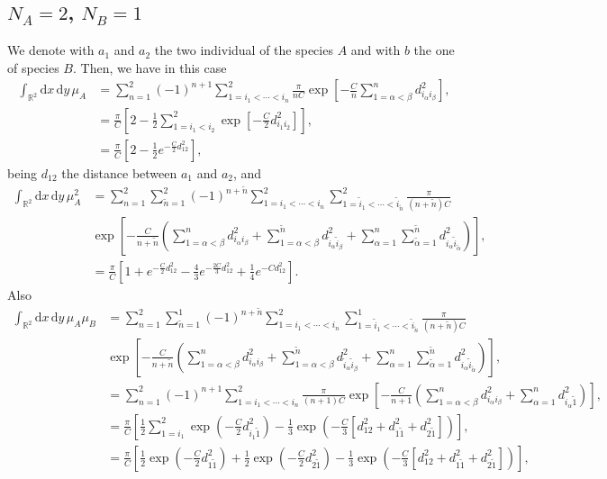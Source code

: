 \documentclass[12pt]{article}
\newcommand{\xd}{\mathrm{d}}
\numberwithin{equation}{section} %
\numberwithin{figure}{section} %
\theoremstyle{definition}
\begin{document}
\subsection{$N_A=2$, $N_B=1$}
We denote with $a_1$ and $a_2$ the two individual of the species $A$ and with $b$ the one of species $B$.  Then, we have in this case
\begin{align}
\int_{{\mathbb R}^2} \xd x \, \xd y \, \mu_A&= \sum_{n=1}^{2} (-1)^{n+1} \sum_{ 1=i_1< \cdots <i_n }^{2} \frac{\pi}{nC} \exp \left[ - \frac{C}{n} \sum_{1=\alpha < \beta}^n d_{i_{\alpha} i_{\beta}}^2 \right], \\
&= \frac{\pi}{C} \left[ 2 - \frac12  \sum_{ 1=i_1< i_2}^{2} \exp \left[- \frac{C}{2}  d_{i_{1} i_{2}}^2 \right]  \right], \\
&= \frac{\pi}{C} \left[ 2 - \frac12  e^{- \frac{C}{2}  d_{{1} {2}}^2 } \right],
\end{align}
being $d_{12}$ the distance between $a_1$ and $a_2$, and
\begin{align}
\int_{{\mathbb R}^2} \xd x \, \xd y \, \mu_A^2 &=  \sum_{n=1}^{2} \sum_{\tilde{n}=1}^{2} (-1)^{n+\tilde{n}} \sum_{ 1=i_1< \cdots <i_n }^{2} \sum_{ 1=\tilde{i}_1< \cdots <\tilde{i}_{\tilde{n}} }^{2} \frac{\pi}{(n+\tilde{n})C}
 \nonumber\\
& \exp \left[ - \frac{C}{n+\tilde{n}} \left( \sum_{1=\alpha < \beta}^n d_{i_{\alpha} i_{\beta}}^2 + \sum_{1=\alpha < \beta}^{\tilde{n}} d_{\tilde{i}_{\alpha} \tilde{i}_{\beta}}^2 +
\sum_{\alpha=1}^n \sum_{\tilde{\alpha}=1}^{\tilde{n}}  d_{i_{\alpha} \tilde{i}_{\tilde{\alpha}}}^2 \right) \right], \\
&= \frac{\pi}{C} \left[ 1+e^{- \frac{C}{2}d^2_{12}} - \frac{4}{3} e^{- \frac{2C}{3} d^2_{1 2} } + \frac{1}{4} e^{- C d_{12}^2 }  \right].
\end{align}
Also
\begin{align}
\int_{{\mathbb R}^2} \xd x \, \xd y \, \mu_A \mu_B &=  \sum_{n=1}^{2} \sum_{\tilde{n}=1}^{1} (-1)^{n+\tilde{n}} \sum_{ 1=i_1< \cdots <i_n }^{2} \sum_{ 1=\tilde{i}_1< \cdots <\tilde{i}_{\tilde{n}} }^{1} \frac{\pi}{(n+\tilde{n})C}
 \nonumber\\
& \exp \left[ - \frac{C}{n+\tilde{n}} \left( \sum_{1=\alpha < \beta}^n d_{i_{\alpha} i_{\beta}}^2 + \sum_{1=\alpha < \beta}^{\tilde{n}} d_{\tilde{i}_{\alpha} \tilde{i}_{\beta}}^2 +
\sum_{\alpha=1}^n \sum_{\tilde{\alpha}=1}^{\tilde{n}}  d_{i_{\alpha} \tilde{i}_{\tilde{\alpha}}}^2 \right) \right], \\
&=  \sum_{n=1}^{2}  (-1)^{n+1} \sum_{ 1=i_1< \cdots <i_n }^{2}  \frac{\pi}{(n+1)C}
 \exp \left[ - \frac{C}{n+1} \left( \sum_{1=\alpha < \beta}^n d_{i_{\alpha} i_{\beta}}^2 +
\sum_{\alpha=1}^n  d_{i_{\alpha} {\tilde{1}}}^2 \right) \right], \\
&= \frac{\pi}{C} \left[  \frac12 \sum_{ 1=i_1 }^{2} \exp \left( - \frac{C}{2} d_{i_1 \tilde{1}}^2 \right)  - \frac{1}{3} \exp \left( -\frac{C}{3} [d_{12}^2 + d_{1 \tilde{1}}^2 + d_{2 \tilde{1}}^2 ]\right)  \right], \\
&= \frac{\pi}{C} \left[  \frac12  \exp \left( - \frac{C}{2} d_{1 \tilde{1}}^2 \right) + \frac12  \exp \left( - \frac{C}{2} d_{2 \tilde{1}}^2 \right)  - \frac{1}{3} \exp \left( -\frac{C}{3} [d_{12}^2 + d_{1 \tilde{1}}^2 + d_{2 \tilde{1}}^2 ]\right)  \right],  
\end{align}
\end{document}
